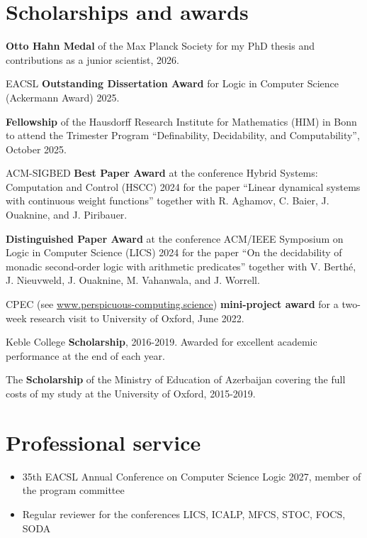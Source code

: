 \documentclass{article}
\begin{document}
	\section*{Scholarships and awards}
	\begin{etaremune}
		\item\textbf{Otto Hahn Medal} of the Max Planck Society for my PhD thesis and contributions as a junior scientist, 2026.
		
		\item EACSL \textbf{Outstanding Dissertation Award} for Logic in Computer Science (Ackermann Award) 2025.
		
		\item \textbf{Fellowship} of the Hausdorff Research Institute for Mathematics (HIM) in Bonn to attend the Trimester Program ``Definability, Decidability, and Computability'', October 2025.
		
		\item ACM-SIGBED \textbf{Best Paper Award} at the conference Hybrid Systems: Computation and Control (HSCC) 2024 for the paper ``Linear dynamical systems with continuous weight functions'' together with R. Aghamov, C. Baier, J. Ouaknine, and J. Piribauer. 
		\item \textbf{Distinguished Paper Award} at the conference ACM/IEEE Symposium on Logic in Computer Science (LICS) 2024 for the paper ``On the decidability of monadic second-order logic with arithmetic predicates'' together with V. Berth\'e, J. Nieuvweld, J. Ouaknine, M. Vahanwala, and J. Worrell. 
		\item CPEC (see \url{www.perspicuous-computing.science}) \textbf{mini-project award} for a two-week research visit to University of Oxford, June 2022.
		\item Keble College \textbf{Scholarship}, 2016-2019. Awarded for excellent academic performance at the end of each year.
		\item The \textbf{Scholarship} of the Ministry of Education of Azerbaijan covering the full costs of my study at the University of Oxford, 2015-2019.
	\end{etaremune}
	
	
	\vspace*{0.2cm}
	\section*{Professional service}
	
	\begin{itemize}
		\item 35th EACSL Annual Conference on Computer Science Logic 2027, member of the program committee
		\item Regular reviewer for the conferences LICS, ICALP, MFCS, STOC, FOCS, SODA
	\end{itemize}
	
\end{document}
